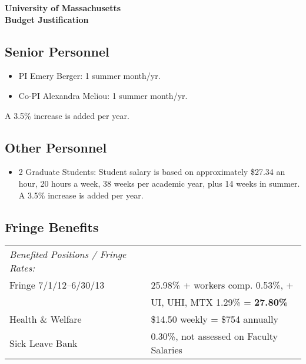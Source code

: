 \thispagestyle{empty}
\singlespace

\begin{center}
        {\large\bf\textsf{
            University of Massachusetts \\ Budget Justification}}
\end{center}

\subsection*{Senior Personnel}
\begin{itemize}
\item PI Emery Berger:  1 summer month/yr.
\item Co-PI Alexandra Meliou: 1 summer month/yr.
\end{itemize}

A 3.5\% increase is added per year.

\subsection*{Other Personnel}
\begin{itemize}
\item 2 Graduate Students: Student salary is based on approximately \$27.34 an hour, 
 20 hours a week, 38 weeks per academic year, plus 14 weeks in summer.
 A 3.5\% increase is added per year. 
\end{itemize}

\subsection*{Fringe Benefits}

\begin{table}[!h]
\centering
\begin{tabular}{|l|l|}
\hline
\emph{Benefited Positions / Fringe Rates:} &  \\
Fringe 7/1/12--6/30/13 &   25.98\% + workers comp. 0.53\%, +      \\
                       &   UI, UHI, MTX 1.29\% = \textbf{27.80\%} \\
\hline
Health \& Welfare      &   \$14.50 weekly = \$754 annually        \\
\hline
Sick Leave Bank        & 0.30\%, not assessed on Faculty Salaries \\
\hline
\end{tabular}
\end{table}

